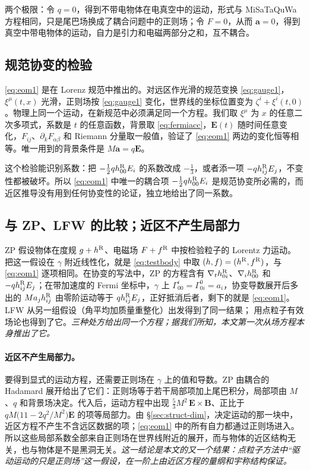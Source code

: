 \documentclass[11pt,a4paper]{ctexart}
\begin{document}
两个极限：令 $q=0$，得到不带电物体在电真空中的运动，形式与 MiSaTaQuWa 方程相同，只是尾巴场换成了耦合问题中的正则场；令 $F=0$，从而 $\boldsymbol a=0$，得到真空中带电物体的运动，自力是引力和电磁两部分之和，互不耦合。

\subsection{规范协变的检验}\label{sec:first-gauge}

\eqref{eq:eom1} 是在 Lorenz 规范中推出的。对远区作光滑的规范变换 \eqref{eq:gauge1}，$\xi^\mu(t,x)$ 光滑，正则场按 \eqref{eq:gauge1} 变化，世界线的坐标位置变为 $\zeta^i+\xi^i(t,0)$。物理上同一个运动，在新规范中必须满足同一个方程。我们取 $\xi^\mu$ 为 $x$ 的任意二次多项式，系数是 $t$ 的任意函数，背景取 \eqref{eq:fermiacc}，$\boldsymbol E(t)$ 随时间任意变化，$F_{ij}$、$\partial_kF_{\alpha\beta}$ 和 Riemann 分量取一般值，验证了 \eqref{eq:eom1} 两边的变化恒等相等。唯一用到的背景条件是 $M\boldsymbol a=q\boldsymbol E$。

这个检验能识别系数：把 $-\tfrac12qh^{\rm R}_{00}E_i$ 的系数改成 $-\tfrac13$，或者添一项 $-qh^{\rm R}_{ij}E_j$，不变性都被破坏。所以 \eqref{eq:eom1} 中唯一的耦合项 $-\tfrac12qh^{\rm R}_{00}E_i$ 是规范协变所必需的，而近区推导没有用到任何协变性的论证，独立地给出了同一系数。

\subsection{与 ZP、LFW 的比较；近区不产生局部力}\label{sec:first-ZP}

ZP 假设物体在度规 $g+h^{\rm R}$、电磁场 $F+f^{\rm R}$ 中按检验粒子的 Lorentz 力运动。把这一假设在 $\gamma$ 附近线性化，就是 \eqref{eq:testbody} 中取 $(h,f)=(h^{\rm R},f^{\rm R})$，与 \eqref{eq:eom1} 逐项相同。在协变的写法中，ZP 的方程含有 $\nabla_t h^{\rm R}_{0i}$、$\nabla_ih^{\rm R}_{00}$ 和 $-qh^{\rm R}_{ij}E_j$；在带加速度的 Fermi 坐标中，$\gamma$ 上 $\Gamma^i_{00}=\Gamma^0_{0i}=a_i$，协变导数展开后多出的 $Ma_jh^{\rm R}_{ij}$ 由零阶运动等于 $qh^{\rm R}_{ij}E_j$，正好抵消后者，剩下的就是 \eqref{eq:eom1}。LFW 从另一组假设（角平均加质量重整化）出发得到了同一结果；\citet{Zimmerman2015} 用点粒子有效场论也得到了它。\emph{三种处方给出同一个方程；据我们所知，本文第一次从场方程本身推出了它。}

\paragraph{近区不产生局部力。}要得到显式的运动方程，还需要正则场在 $\gamma$ 上的值和导数。ZP 由耦合的 Hadamard 展开给出了它们：正则场等于若干局部项加上尾巴积分，局部项由 $M$、$q$ 和背景场决定。代入后，运动方程中出现 $\tfrac53M^2\,\boldsymbol E\times\boldsymbol B$、正比于 $qM\big(11-2q^2/M^2\big)\dot{\boldsymbol E}$ 的项等局部力。由 \S\ref{sec:struct-dim}，决定运动的那一块中，近区方程不产生不含远区数据的项；\eqref{eq:eom1} 中的所有自力都通过正则场进入。所以这些局部系数全部来自正则场在世界线附近的展开，而与物体的近区结构无关，也与物体是不是黑洞无关。\emph{这一结论是本文的又一个结果：点粒子方法中“驱动运动的只是正则场”这一假设，在一阶上由近区方程的量纲和宇称结构保证。}
\end{document}
